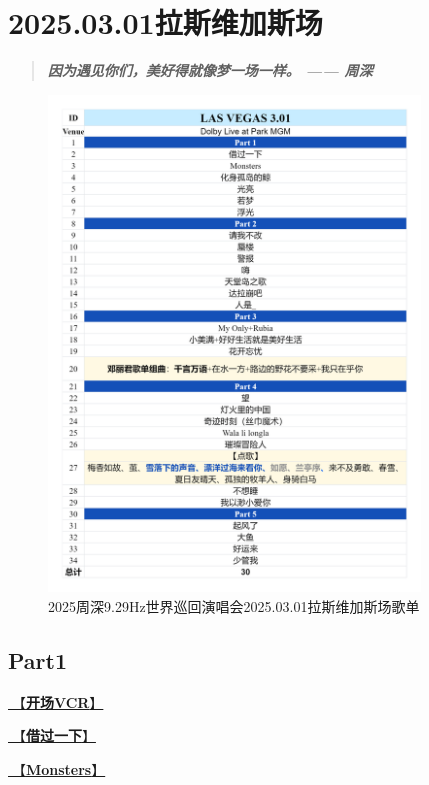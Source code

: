 \documentclass[]{ctexbook}
\begin{document}
\chapter{2025.03.01拉斯维加斯场}\label{LasVegas-20250301}

\begin{quote}
\textbf{\emph{因为遇见你们，美好得就像梦一场一样。 ------ 周深}}
\end{quote}

\begin{figure}

{\centering \includegraphics[width=280pt]{img/playlists/playlists-lasvegas-20250301} 

}

\caption{2025周深9.29Hz世界巡回演唱会2025.03.01拉斯维加斯场歌单}\label{fig:unnamed-chunk-176}
\end{figure}

\newpage

\section{Part1}\label{LasVegas-20250301-part1}

\hyperref[opening-vcr]{🎥【\textbf{开场VCR}】}

\hyperref[I-will-go-my-way]{🎵【\textbf{借过一下}】}

\hyperref[Monsters]{🎵【\textbf{Monsters}】}
\end{document}

